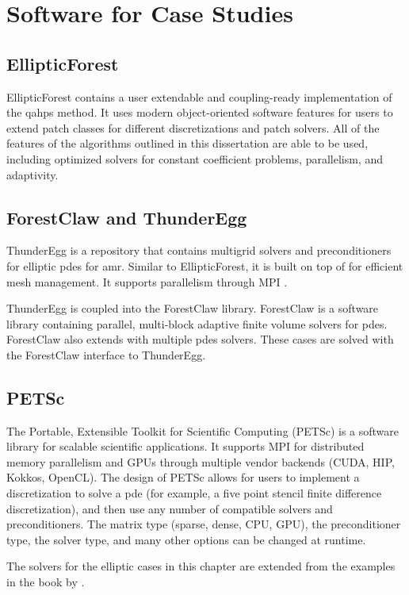\section{Software for Case Studies}

\subsection{EllipticForest}
\label{sub:elliptic-forest}

EllipticForest contains a user extendable and coupling-ready implementation of the \gls{qahps} method. It uses modern object-oriented software features for users to extend patch classes for different discretizations and patch solvers. All of the features of the algorithms outlined in this dissertation are able to be used, including optimized solvers for constant coefficient problems, parallelism, and adaptivity.

\subsection{ForestClaw and ThunderEgg}
\label{sub:thunder-egg}

ThunderEgg \citep{aiton2022thunderegg} is a repository that contains multigrid solvers and preconditioners for elliptic \gls{pdes} for \gls{amr}. Similar to EllipticForest, it is built on top of \pforest \citep{burstedde2011p4est,burstedde2020parallel} for efficient mesh management. It supports parallelism through MPI \citep{mpi40}.

ThunderEgg is coupled into the ForestClaw library. ForestClaw \citep{calhoun2017forestclaw} is a software library containing parallel, multi-block adaptive finite volume solvers for \gls{pdes}. ForestClaw also extends \pforest \citep{burstedde2011p4est,burstedde2020parallel} with multiple \gls{pdes} solvers. These cases are solved with the ForestClaw interface to ThunderEgg.

\subsection{PETSc}
\label{sub:petsc}

The Portable, Extensible Toolkit for Scientific Computing (PETSc) is a software library for scalable scientific applications. It supports MPI \citep{mpi40} for distributed memory parallelism and GPUs through multiple vendor backends (CUDA, HIP, Kokkos, OpenCL). The design of PETSc allows for users to implement a discretization to solve a \gls{pde} (for example, a five point stencil finite difference discretization), and then use any number of compatible solvers and preconditioners. The matrix type (sparse, dense, CPU, GPU), the preconditioner type, the solver type, and many other options can be changed at runtime.

The solvers for the elliptic cases in this chapter are extended from the examples in the book by \cite{bueler2020petsc}.